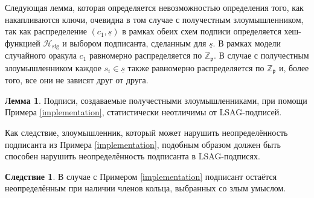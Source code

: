 \documentclass{mrl}
\theoremstyle{definition}
\numberwithin{theorem}{subsection}
\newtheorem{lemma}[theorem]{Лемма}
\newtheorem{cor}[theorem]{Следствие}
\newtheorem{defn}[theorem]{Определение}
\newcommand{\adversary}{\mathcal{A}}
\begin{document}
Следующая лемма, которая определяется невозможностью определения того, как накапливаются ключи, очевидна в том случае с получестным злоумышленником, так как распределение $(c_1, \underline{s})$ в рамках обеих схем подписи определяется хеш-функцией $\mathcal{H}_{\text{sig}}$ и выбором подписанта, сделанным для $\underline{s}$. В рамках модели случайного оракула $c_1$ равномерно распределяется по $\mathbb{Z}_\mathfrak{p}$. В случае с получестным злоумышленником каждое $s_i \in \underline{s}$ также равномерно распределяется по $\mathbb{Z}_\mathfrak{p}$ и, более того, все они не зависят друг от друга.

\begin{lemma}
Подписи, создаваемые получестными злоумышленниками, при помощи Примера \ref{implementation}, статистически неотличимы от LSAG-подписей.
\end{lemma}

Как следствие, злоумышленник, который может нарушить неопределённость подписанта из Примера \ref{implementation}, подобным образом должен быть способен нарушить неопределённость подписанта в LSAG-подписях.
\begin{cor}
В случае с Примером \ref{implementation} подписант остаётся неопределённым при наличии членов кольца, выбранных со злым умыслом.
\end{cor}



\end{document}
